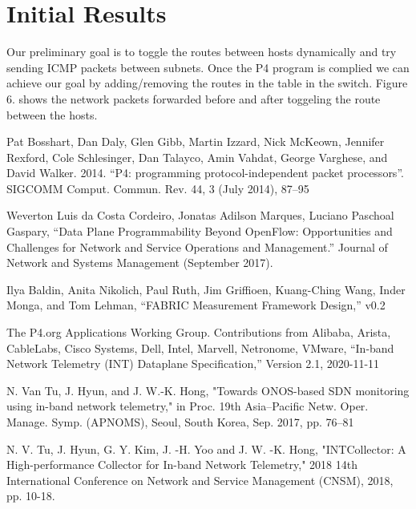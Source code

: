 \documentclass[conference]{IEEEtran}
\begin{document}
    \section{Initial Results}
    Our preliminary goal is to toggle the routes between hosts dynamically and try sending ICMP packets between subnets. Once the P4 program is complied we can achieve our goal by adding/removing the routes in the table in the switch. Figure 6. shows the network packets forwarded before and after toggeling the route between the hosts.


    \begin{thebibliography}{00}
         Pat Bosshart, Dan Daly, Glen Gibb, Martin Izzard, Nick McKeown, Jennifer Rexford, Cole Schlesinger, Dan Talayco, Amin Vahdat, George Varghese, and David Walker. 2014. “P4: programming protocol-independent packet processors”. SIGCOMM Comput. Commun. Rev. 44, 3 (July 2014), 87–95

         Weverton Luis da Costa Cordeiro, Jonatas Adilson Marques, Luciano Paschoal Gaspary, “Data Plane Programmability Beyond OpenFlow: Opportunities and Challenges for Network and Service Operations and Management.” Journal of Network and Systems Management (September 2017).

         Ilya Baldin, Anita Nikolich, Paul Ruth, Jim Griffioen, Kuang-Ching Wang, Inder Monga, and Tom Lehman, “FABRIC Measurement Framework Design,” v0.2

         The P4.org Applications Working Group. Contributions from Alibaba, Arista, CableLabs, Cisco Systems, Dell, Intel, Marvell, Netronome, VMware, “In-band Network Telemetry (INT) Dataplane Specification,” Version 2.1, 2020-11-11

         N. Van Tu, J. Hyun, and J. W.-K. Hong, "Towards ONOS-based SDN monitoring using in-band network telemetry," in Proc. 19th Asia–Pacific Netw. Oper. Manage. Symp. (APNOMS), Seoul, South Korea, Sep. 2017, pp. 76–81

         N. V. Tu, J. Hyun, G. Y. Kim, J. -H. Yoo and J. W. -K. Hong, "INTCollector: A High-performance Collector for In-band Network Telemetry," 2018 14th International Conference on Network and Service Management (CNSM), 2018, pp. 10-18.
    \end{thebibliography}
\end{document}
